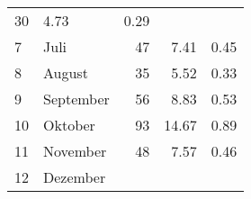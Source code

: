 \begin{longtable}{lXrrr}
       \num{30} &
       \num[round-mode=places,round-precision=2]{4,73} &
         \num[round-mode=places,round-precision=2]{0,29} \\

     7 &
     \multicolumn{1}{X}{ Juli   } &


       \num{47} &
       \num[round-mode=places,round-precision=2]{7,41} &
         \num[round-mode=places,round-precision=2]{0,45} \\

     8 &
     \multicolumn{1}{X}{ August   } &


       \num{35} &
       \num[round-mode=places,round-precision=2]{5,52} &
         \num[round-mode=places,round-precision=2]{0,33} \\

     9 &
     \multicolumn{1}{X}{ September   } &


       \num{56} &
       \num[round-mode=places,round-precision=2]{8,83} &
         \num[round-mode=places,round-precision=2]{0,53} \\

     10 &
     \multicolumn{1}{X}{ Oktober   } &


       \num{93} &
       \num[round-mode=places,round-precision=2]{14,67} &
         \num[round-mode=places,round-precision=2]{0,89} \\

     11 &
     \multicolumn{1}{X}{ November   } &


       \num{48} &
       \num[round-mode=places,round-precision=2]{7,57} &
         \num[round-mode=places,round-precision=2]{0,46} \\

     12 &
     \multicolumn{1}{X}{ Dezember   } &



\end{longtable}
